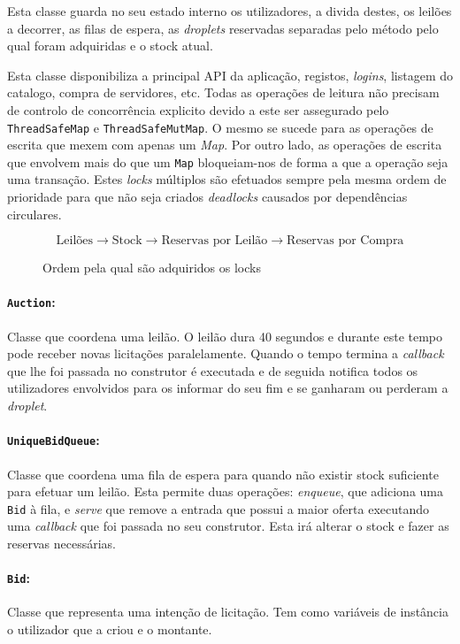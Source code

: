 \documentclass[a4paper]{article}
\begin{document}
Esta classe guarda no seu estado interno os utilizadores, a divida destes, os leilões a decorrer, as filas de espera, as \textit{droplets} reservadas separadas pelo método pelo qual foram adquiridas e o stock atual.

Esta classe disponibiliza a principal API da aplicação, registos, \textit{logins}, listagem do catalogo, compra de servidores, etc. Todas as operações de leitura não precisam de controlo de concorrência explicito devido a este ser assegurado pelo \texttt{ThreadSafeMap} e \texttt{ThreadSafeMutMap}. O mesmo se sucede para as operações de escrita que mexem com apenas um \textit{Map}. Por outro lado, as operações de escrita que envolvem mais do que um \texttt{Map} bloqueiam-nos de forma a que a operação seja uma transação. Estes \textit{locks} múltiplos são efetuados sempre pela mesma ordem de prioridade para que não seja criados \textit{deadlocks} causados por dependências circulares.
\begin{figure}[H]
    \centering
    $$\textrm{Leilões} \rightarrow \textrm{Stock} \rightarrow \textrm{Reservas por Leilão} \rightarrow \textrm{Reservas por Compra}$$
    \caption{Ordem pela qual são adquiridos os locks}
\end{figure}

\paragraph{\texttt{Auction}:}
Classe que coordena uma leilão. O leilão dura 40 segundos e durante este tempo pode receber novas licitações paralelamente. Quando o tempo termina a \textit{callback} que lhe foi passada no construtor é executada e de seguida notifica todos os utilizadores envolvidos para os informar do seu fim e se ganharam ou perderam a \textit{droplet}.

\paragraph{\texttt{UniqueBidQueue}:}
Classe que coordena uma fila de espera para quando não existir stock suficiente para efetuar um leilão. Esta permite duas operações: \textit{enqueue}, que adiciona uma \texttt{Bid} à fila, e \textit{serve} que remove a entrada que possui a maior oferta executando uma \textit{callback} que foi passada no seu construtor. Esta irá alterar o stock e fazer as reservas necessárias.

\paragraph{\texttt{Bid}:}
Classe que representa uma intenção de licitação. Tem como variáveis de instância o utilizador que a criou e o montante.
\end{document}
